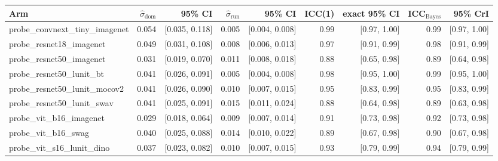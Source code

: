 \begin{tabular}{lrrrrrrrr}
\toprule
Arm & $\hat\sigma_\text{dom}$ & 95\% CI & $\hat\sigma_\text{run}$ & 95\% CI & ICC(1) & exact 95\% CI & ICC$_\text{Bayes}$ & 95\% CrI \\
\midrule
probe\_convnext\_tiny\_imagenet & 0.054 & [0.035, 0.118] & 0.005 & [0.004, 0.008] & 0.99 & [0.97, 1.00] & 0.99 & [0.97, 1.00] \\
probe\_resnet18\_imagenet & 0.049 & [0.031, 0.108] & 0.008 & [0.006, 0.013] & 0.97 & [0.91, 0.99] & 0.98 & [0.91, 0.99] \\
probe\_resnet50\_imagenet & 0.031 & [0.019, 0.070] & 0.011 & [0.008, 0.018] & 0.88 & [0.65, 0.98] & 0.89 & [0.64, 0.98] \\
probe\_resnet50\_lunit\_bt & 0.041 & [0.026, 0.091] & 0.005 & [0.004, 0.008] & 0.98 & [0.95, 1.00] & 0.99 & [0.95, 1.00] \\
probe\_resnet50\_lunit\_mocov2 & 0.041 & [0.026, 0.090] & 0.010 & [0.007, 0.015] & 0.95 & [0.83, 0.99] & 0.95 & [0.83, 0.99] \\
probe\_resnet50\_lunit\_swav & 0.041 & [0.025, 0.091] & 0.015 & [0.011, 0.024] & 0.88 & [0.64, 0.98] & 0.89 & [0.63, 0.98] \\
probe\_vit\_b16\_imagenet & 0.029 & [0.018, 0.064] & 0.009 & [0.007, 0.014] & 0.91 & [0.73, 0.98] & 0.92 & [0.73, 0.98] \\
probe\_vit\_b16\_swag & 0.040 & [0.025, 0.088] & 0.014 & [0.010, 0.022] & 0.89 & [0.67, 0.98] & 0.90 & [0.67, 0.98] \\
probe\_vit\_s16\_lunit\_dino & 0.037 & [0.023, 0.082] & 0.010 & [0.007, 0.015] & 0.93 & [0.79, 0.99] & 0.94 & [0.79, 0.99] \\
\bottomrule
\end{tabular}
